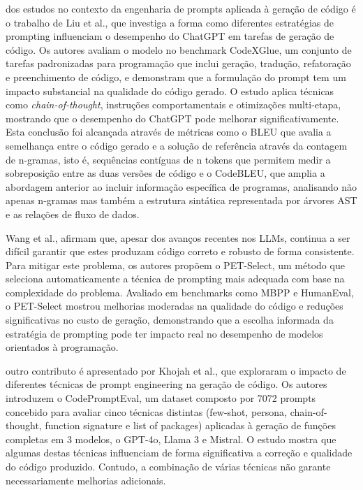  dos estudos no contexto da engenharia de prompts aplicada à geração de código é o trabalho de Liu et al.\cite{ChatGPTGenerationPE}, que investiga a forma como diferentes estratégias de prompting influenciam o desempenho do ChatGPT em tarefas de geração de código. Os autores avaliam o modelo no benchmark CodeXGlue, um conjunto de tarefas padronizadas para programação que inclui geração, tradução, refatoração e preenchimento de código, e demonstram que a formulação do prompt tem um impacto substancial na qualidade do código gerado. O estudo aplica técnicas como \textit{chain-of-thought}, instruções comportamentais e otimizações multi-etapa, mostrando que o desempenho do ChatGPT pode melhorar significativamente. Esta conclusão foi alcançada através de métricas como o BLEU que avalia a semelhança entre o código gerado e a solução de referência através da contagem de n-gramas, isto é, sequências contíguas de n tokens que permitem medir a sobreposição entre as duas versões de código e o CodeBLEU, que amplia a abordagem anterior ao incluir informação específica de programas, analisando não apenas n-gramas mas também a estrutura sintática representada por árvores AST e as relações de fluxo de dados.\\\par

 Wang et al.\cite{PET-SELECT}, afirmam que, apesar dos avanços recentes nos LLMs, continua a ser difícil garantir que estes produzam código correto e robusto de forma consistente. Para mitigar este problema, os autores propõem o PET-Select, um método que seleciona automaticamente a técnica de prompting mais adequada com base na complexidade do problema. Avaliado em benchmarks como MBPP e HumanEval, o PET-Select mostrou melhorias moderadas na qualidade do código e reduções significativas no custo de geração, demonstrando que a escolha informada da estratégia de prompting pode ter impacto real no desempenho de modelos orientados à programação.\\\par

 outro contributo é apresentado por Khojah et al.\cite{PEIMPACTWITHCODEPROMPTEVAL}, que exploraram o impacto de diferentes técnicas de prompt engineering na geração de código. Os autores introduzem o CodePromptEval, um dataset composto por 7072 prompts concebido para avaliar cinco técnicas distintas (few-shot, persona, chain-of-thought, function signature e list of packages) aplicadas à geração de funções completas em 3 modelos, o GPT-4o, Llama 3 e Mistral. O estudo mostra que algumas destas técnicas influenciam de forma significativa a correção e qualidade do código produzido. Contudo, a combinação de várias técnicas não garante necessariamente melhorias adicionais.\\

